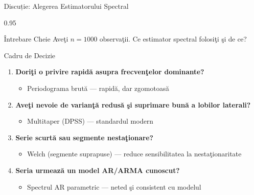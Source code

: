 \documentclass[9pt, aspectratio=169, t]{beamer}
\begin{document}
\begin{frame}{Discuție: Alegerea Estimatorului Spectral}
    \begin{cminipage}{0.95\textwidth}
    {\small
    \begin{alertblock}{Întrebare Cheie}
        Aveţi $n = 1000$ observaţii. Ce estimator spectral folosiţi şi de ce?
    \end{alertblock}
    \begin{block}{Cadru de Decizie}
        \begin{enumerate}\setlength{\itemsep}{0pt}
            \item \textbf{Doriţi o privire rapidă asupra frecvenţelor dominante?}
                \begin{itemize}\setlength{\itemsep}{0pt}
                    \item Periodograma brută --- rapidă, dar zgomotoasă
                \end{itemize}
            \item \textbf{Aveţi nevoie de varianţă redusă şi suprimare bună a lobilor laterali?}
                \begin{itemize}\setlength{\itemsep}{0pt}
                    \item Multitaper (DPSS) --- standardul modern
                \end{itemize}
            \item \textbf{Serie scurtă sau segmente nestaţionare?}
                \begin{itemize}\setlength{\itemsep}{0pt}
                    \item Welch (segmente suprapuse) --- reduce sensibilitatea la nestaţionaritate
                \end{itemize}
            \item \textbf{Seria urmează un model AR/ARMA cunoscut?}
                \begin{itemize}\setlength{\itemsep}{0pt}
                    \item Spectrul AR parametric --- neted şi consistent cu modelul
                \end{itemize}
        \end{enumerate}
    \end{block}
    }
    \end{cminipage}
\end{frame}
\end{document}
